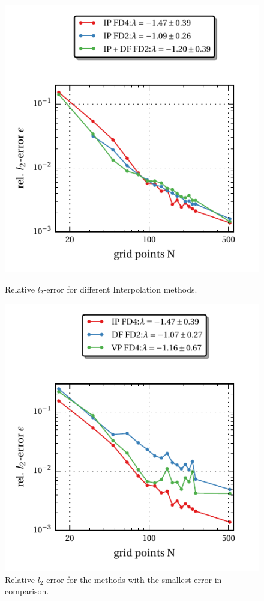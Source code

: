 \begin{figure}[!bp]
  \begin{minipage}[c]{0.45\textwidth}
      \includegraphics{gfx/immersed_boundary/tcflow/theo/ip.pdf}
      \caption{Relative $l_2$-error for different Interpolation methods.}
      \label{vali:tc_flow_gc_ip}
  \end{minipage}
  \hfill
  \begin{minipage}[c]{0.45\textwidth}
      \includegraphics{gfx/immersed_boundary/tcflow/theo/all.pdf}
      \caption{Relative $l_2$-error for the methods with the smallest error in comparison.}
      \label{vali:tc_flow_gc_all}
  \end{minipage}
\end{figure}
\clearpage

